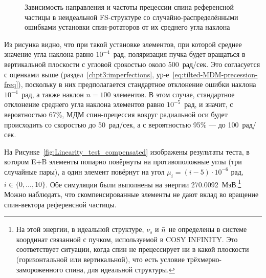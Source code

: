 \begin{figure}[H]\centering
	\caption{Зависимость направления и частоты прецессии спина референсной частицы в неидеальной FS-структуре со случайно-распределёнными ошибками установки спин-ротаторов от их среднего угла наклона\label{fig:Linearity_test_shifting_gauss}}
\end{figure}

Из рисунка видно, что при такой установке элементов, при которой среднее значение угла наклона равно 
$10^{-4}$~рад, поляризация пучка будет вращаться в вертикальной плоскости с угловой срокостью 
около 500~рад/сек. Это согласуется с оценками выше (раздел~\ref{chpt3:imperfections},
 ур-е~\eqref{eq:tilted-MDM-precession-freq}), поскольку в них предполагается 
 стандартное отклонение ошибки наклона $10^{-4}$~рад, а также наклон ${n=100}$ элементов. 
 В этом случае, стандартное отклонение среднего угла наклона элементов равно $10^{-5}$~рад, и значит, 
 с вероятностью 67\%, МДМ спин-прецессия вокруг радиальной оси будет происходить со скоростью 
 до 50~рад/сек, а с вероятностью 95\% --- до 100~рад/сек.

На Рисунке~\ref{fig:Linearity_test_compensated} изображены результаты теста, в котором 
E+B элементы попарно повёрнуты на противоположные углы (три случайные пары), а один элемент 
повёрнут на угол ${\mu_i = (i-5)\cdot 10^{-6}}$ рад, ${i\in\lbrace0,\dots,10\rbrace}$. Обе симуляции были 
выполнены на энергии 270.0092~МэВ.\footnote{На этой энергии, в идеальной структуре, 
	$\nu_s$ и $\bar n$ не определены в системе координат связанной с пучком, используемой в
	COSY INFINITY. Это соответствует ситуации, когда спин не прецессирует ни в какой плоскости 
	(горизонтальной или вертикальной), что есть условие трёхмерно-замороженного спина, 
	для идеальной структуры.} Можно наблюдать, что скомпенсированные элементы не дают вклад во вращение
спин-вектора референсной частицы.

